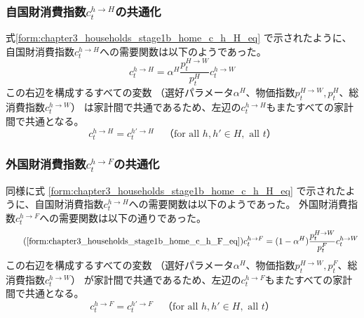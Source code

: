 \subsubsection{自国財消費指数\(c_t^{h\to H}\)の共通化}
\label{sec:chapter3_risk_sharing_commonization_home_c_h_H}
式\eqref{form:chapter3_households_stage1b_home_c_h_H_eq}
で示されたように、自国財消費指数\(c_t^{h\to H}\)への需要関数は以下のようであった。
\begin{equation}
\label{form:chapter3_risk_sharing_commonization_home_c_h_H_eq}
    c_t^{h\to H}=\alpha^H\frac{p_t^{H\to W}}{p_t^H}c_t^{h\to W}
\end{equation}
この右辺を構成するすべての変数
（選好パラメータ\(\alpha^H\)、物価指数\(p_t^{H\to W}, p_t^H\)、総消費指数\(c_t^{h\to W}\)）
は家計間で共通であるため、左辺の\(c_t^{h\to H}\)もまたすべての家計間で共通となる。
\begin{equation}
\label{form:chapter3_risk_sharing_commonization_home_c_h_H_equality_eq}
    c_t^{h\to H}=c_t^{h'\to H}\quad（\text{for all }h,h'\in H,\text{ all }t）
\end{equation}

\subsubsection{外国財消費指数\(c_t^{h\to F}\)の共通化}
\label{sec:chapter3_risk_sharing_commonization_home_c_h_F}
同様に式
\eqref{form:chapter3_households_stage1b_home_c_h_H_eq}
で示されたように、自国財消費指数\(c_t^{h\to H}\)への需要関数は以下のようであった。
外国財消費指数\(c_t^{h\to F}\)への需要関数は以下の通りであった。
\begin{equation}
\tag{\ref{form:chapter3_households_stage1b_home_c_h_F_eq}}
    c_t^{h\to F}=(1-\alpha^H)\frac{p_t^{H\to W}}{p_t^F}c_t^{h\to W}
\end{equation}
この右辺を構成するすべての変数
（選好パラメータ\(\alpha^H\)、物価指数\(p_t^{H\to W}, p_t^F\)、総消費指数\(c_t^{h\to W}\)）
が家計間で共通であるため、左辺の\(c_t^{h\to F}\)もまたすべての家計間で共通となる。
\begin{equation}
\label{form:chapter3_risk_sharing_commonization_home_c_h_F_equality_eq}
    c_t^{h\to F}=c_t^{h'\to F}\quad（\text{for all }h,h'\in H,\text{ all }t）
\end{equation}

